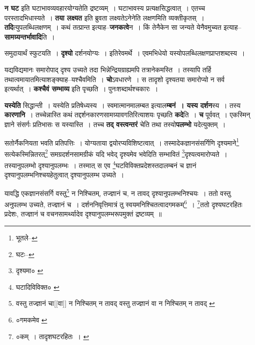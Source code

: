 \documentclass[article,12pt,a4paper]{memoir}
\begin{document}
	  \endgroup
	

	  \pstart \textbf{न घट} इति घटाभावव्यवहारयोग्यतेति द्रष्टव्यम् । घटाभावस्य प्रत्यक्षसिद्धत्वात् । एतच्च परस्तादभिधास्यते । \textbf{तया लक्ष्यत} इति ब्रुवता लक्ष्यतेऽनेनेति लक्षणमिति व्यक्तीकृतस् । \textbf{तदि}त्युपलब्धिलक्षणम् । कथं तत्प्रान्त इत्याह--\textbf{जनकत्वे}न । किं तेनैकेन सा जन्यते ये\leavevmode{}नैवमुच्यत इत्याह--\textbf{सामग्र्यन्तर्भावादि}ति ।
	\pend
      

	  \pstart समुदायार्थं स्फुटयति । \textbf{दृश्यो} दर्शनयोग्यः । इतिरेवमर्थे । एवमभिधेयो यस्योपलब्धिलक्षणप्राप्तशब्दस्य ।
	\pend
      

	  \pstart यद्यविद्यमानः समारोपाद् दृश्य उच्यते तदा भिन्नेन्द्रियग्राह्यमपि तत्रानेकमस्ति । तस्यापि तर्हि तथात्वमायातमित्याशङ्क्याह--यश्चैवमिति । \textbf{चो}ऽवधारणे । स तादृशो दृश्यतया समारोप्यो न सर्व इत्यर्थात् । \textbf{कश्चैवं सम्भाव्य} इति पृच्छति । पुनःशब्दार्थश्चकारः ।
	\pend
      

	  \pstart \textbf{यस्येति} सिद्धान्ती । यस्येति प्रतिषेध्यस्य । स्वमात्मानमालम्बत इत्याल\textbf{म्बनं । यस्य दर्शन}स्य । तस्य \textbf{कारणानि} । तच्चेन्नास्ति कथं तद्दर्शनकारणसामग्र्यावगतिरित्याशयः पृच्छति \textbf{कदे}ति । \textbf{च} पूर्ववत् । एकस्मिन् ज्ञाने संसर्गः प्रतिभासः स यस्यास्ति । तच्च \textbf{तद् वस्त्वन्तरं} चेति तथा तस्यो\textbf{पलम्भो} यदेत्युक्तम् ।
	\pend
      \leavevmode{}
	  \bigskip
	  \begingroup
	

	  \pstart सतोर्नैकनियता भवति प्रतिपत्तिः । योग्यताया द्वयोरप्यविशिष्टत्वात् । तस्मादेकज्ञानसंसर्गिणि दृश्यमाने\footnote{भूतले--\cite{dp-msD-n}} सत्येकस्मिन्नितरत्\footnote{घटः--\cite{dp-msD-n}} समग्रदर्शनसामग्रीकं यदि भवेद् दृश्यमेव भवेदिति सम्भावितं \footnote{दृश्यमा० \cite{dp-msA} \cite{dp-edP} \cite{dp-edH} \cite{dp-edE} \cite{dp-edN}}दृश्यत्वमारोप्यते । तस्यानुपलम्भो दृश्यानुपलम्भः । तस्मात् स एव \footnote{घटादिविविक्त० \cite{dp-msB}}घटविविक्तप्रदेशस्तदालम्बनं च ज्ञानं दृश्यानुपलम्भनिश्चयहेतुत्वात् दृश्यानुपलम्भ उच्यते ।
	\pend
       

	  \pstart यावद्धि एकज्ञानसंसर्गि वस्तु\footnote{वस्तु तज्ज्ञानं चा[[वा]] न निश्चितम् न तावद् \cite{dp-msB} वस्तु तज्ज्ञानं वा न निश्चितम् न तावद् \cite{dp-msD}} न निश्चितम्, तज्ज्ञानं च, न तावद् दृश्यानुपलम्भनिश्चयः । ततो वस्तु अनुपलम्भ उच्यते, तज्ज्ञानं च । दर्शननिवृत्तिमात्रं तु स्वयमनिश्चितत्वादगमकम्\footnote{०गमकमेव \cite{dp-msC}} । \footnote{०कम् । तादृशघटरहितः । \cite{dp-msB}}ततो दृश्यघटरहितः प्रदेशः, तज्ज्ञानं च वचनसामर्थ्यादेव दृश्यानुपलम्भरूपमुक्तं द्रष्टव्यम् ॥
	\pend
      
\end{document}
